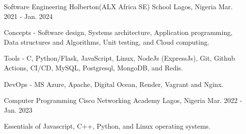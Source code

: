 

\begin{cventries}

  \cventry
    {Software Engineering} %
    {Holberton(ALX Africa SE) School} %
    {Lagos, Nigeria} %
    {Mar. 2021 - Jan. 2024} %
    {
      \begin{cvitems} %
        \item {Concepts - Software design, Systems architecture, Application programming, Data structures and Algorithms, Unit testing, and Cloud computing.}
        \item {Tools - C, Python/Flask, JavaScript, Linux, NodeJs (ExpressJs), Git, Github Actions, CI/CD, MySQL, Postgresql, MongoDB, and Redis.}
        \item {DevOps - MS Azure, Apache, Digital Ocean, Render, Vagrant and Nginx.}
      \end{cvitems}
    }

  \cventry
    {Computer Programming} %
    {Cisco Networking Academy} %
    {Lagos, Nigeria} %
    {Mar. 2022 - Jan. 2023} %
    {
      \begin{cvitems} %
        \item {Essentials of Javascript, C++, Python, and Linux operating systems.}
      \end{cvitems}
    }

\end{cventries}
